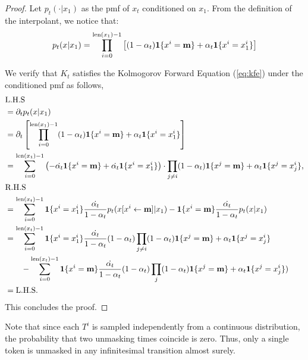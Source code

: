 \begin{proof}
Let $p_t(\cdot | x_1)$ as the pmf of $x_t$ conditioned on $x_1$. From the definition of the interpolant, we notice that:
\begin{align*}
    p_t(x | x_1) = \prod_{i=0}^{\text{len}(x_1)-1} \left[(1-\alpha_t) \mathbf{1}\{x^i = \mathbf{m}\} + \alpha_t \mathbf{1}\{x^i = x_1^i\}\right]
\end{align*}

We verify that $K_t$ satisfies the Kolmogorov Forward Equation  (\ref{eq:kfe}) under the conditioned pmf as follows,
\begin{align*}
     &\text{L.H.S} \\
     &= \partial_t p_t(x|x_1)\\
     &= \partial_t \left[\prod_{i=0}^{\text{len}(x_1)-1} (1-\alpha_t) \mathbf{1}\{x^i = \mathbf{m}\} + \alpha_t \mathbf{1}\{x^i = x_1^i\}\right] \\ 
     &= \sum_{i=0}^{\text{len}(x_1)-1} \left(-\dot{\alpha_t} \mathbf{1}\{x^i = \mathbf{m}\} + \dot{\alpha_t} \mathbf{1}\{x^i = x_1^i\}\right) \cdot \prod_{j\neq i}(1-\alpha_t) \mathbf{1}\{x^j = \mathbf{m}\} +\alpha_t \mathbf{1}\{x^j = x_j^i\},\\
    &\text{R.H.S} \\
    &= \sum_{i=0}^{\text{len}(x_t)-1} \mathbf{1}\{x^i=x_1^i\} \frac{\dot{\alpha_t}}{1-\alpha_t} p_t(x[x^{i} \leftarrow \mathbf{m}]|x_1) -  \mathbf{1}\{x^i=\mathbf{m}\} \frac{\dot{\alpha_t}}{1-\alpha_t}  p_t(x|x_1) \\
    &= \sum_{i=0}^{\text{len}(x_t)-1} \mathbf{1}\{x^i=x_1^i\} \frac{\dot{\alpha_t}}{1-\alpha_t} (1-\alpha_t) \prod_{j\neq i}(1-\alpha_t) \mathbf{1}\{x^j = \mathbf{m}\} +\alpha_t \mathbf{1}\{x^j = x_j^i\} \\& \quad\quad -\sum_{i=0}^{\text{len}(x_t)-1}  \mathbf{1}\{x^i=\mathbf{m}\} \frac{\dot{\alpha_t}}{1-\alpha_t} (1-\alpha_t) \prod_{j}(1-\alpha_t) \mathbf{1}\{x^j = \mathbf{m}\} +\alpha_t \mathbf{1}\{x^j = x_j^i\}) \\
    &= \text{L.H.S}.
\end{align*}
This concludes the proof.
\end{proof}
Note that since each $T^i$ is sampled independently from a continuous distribution, the probability that two unmasking times coincide is zero. Thus, only a single token is unmasked in any infinitesimal transition almost surely.


